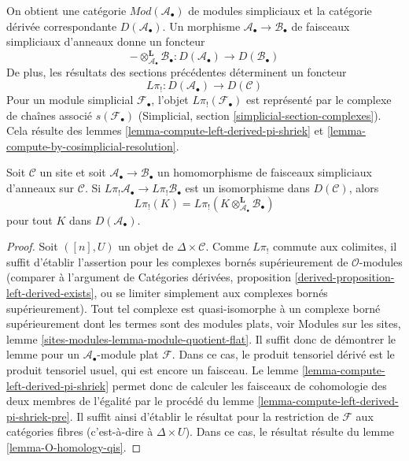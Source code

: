 \noindent
On obtient une catégorie $\textit{Mod}(\mathcal{A}_\bullet)$ de modules
simpliciaux et la catégorie dérivée correspondante
$D(\mathcal{A}_\bullet)$. Un morphisme
$\mathcal{A}_\bullet \to \mathcal{B}_\bullet$ de faisceaux simpliciaux
d'anneaux donne un foncteur
$$
- \otimes^\mathbf{L}_{\mathcal{A}_\bullet} \mathcal{B}_\bullet :
D(\mathcal{A}_\bullet)
\longrightarrow
D(\mathcal{B}_\bullet)
$$
De plus, les résultats des sections précédentes déterminent un foncteur
$$
L\pi_! : D(\mathcal{A}_\bullet) \longrightarrow D(\mathcal{C})
$$
Pour un module simplicial $\mathcal{F}_\bullet$, l'objet
$L\pi_!(\mathcal{F}_\bullet)$ est représenté par le complexe de chaînes
associé $s(\mathcal{F}_\bullet)$ (Simplicial, section
\ref{simplicial-section-complexes}). Cela résulte des lemmes
\ref{lemma-compute-left-derived-pi-shriek} et
\ref{lemma-compute-by-cosimplicial-resolution}.

\begin{lemma}
\label{lemma-base-change-by-qis}
Soit $\mathcal{C}$ un site et soit
$\mathcal{A}_\bullet \to \mathcal{B}_\bullet$ un homomorphisme de faisceaux
simpliciaux d'anneaux sur $\mathcal{C}$. Si
$L\pi_!\mathcal{A}_\bullet \to L\pi_!\mathcal{B}_\bullet$ est un
isomorphisme dans $D(\mathcal{C})$, alors
$$
L\pi_!(K) =
L\pi_!(K \otimes^\mathbf{L}_{\mathcal{A}_\bullet} \mathcal{B}_\bullet)
$$
pour tout $K$ dans $D(\mathcal{A}_\bullet)$.
\end{lemma}

\begin{proof}
Soit $([n], U)$ un objet de $\Delta \times \mathcal{C}$. Comme $L\pi_!$
commute aux colimites, il suffit d'établir l'assertion pour les complexes
bornés supérieurement de $\mathcal{O}$-modules (comparer à l'argument de
Catégories dérivées, proposition
\ref{derived-proposition-left-derived-exists}, ou se limiter simplement aux
complexes bornés supérieurement). Tout tel complexe est quasi-isomorphe à un
complexe borné supérieurement dont les termes sont des modules plats, voir
Modules sur les sites, lemme \ref{sites-modules-lemma-module-quotient-flat}. Il
suffit donc de démontrer le lemme pour un
$\mathcal{A}_\bullet$-module plat $\mathcal{F}$. Dans ce cas, le produit
tensoriel dérivé est le produit tensoriel usuel, qui est encore un faisceau.
Le lemme \ref{lemma-compute-left-derived-pi-shriek} permet donc de calculer
les faisceaux de cohomologie des deux membres de l'égalité par le procédé du
lemme \ref{lemma-compute-left-derived-pi-shriek-pre}. Il suffit ainsi
d'établir le résultat pour la restriction de $\mathcal{F}$ aux catégories
fibres (c'est-à-dire à $\Delta \times U$). Dans ce cas, le résultat résulte du
lemme \ref{lemma-O-homology-qis}.
\end{proof}

